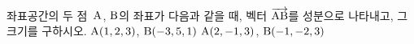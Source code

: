 좌표공간의 두 점~$\mathrm{A}$, $\mathrm{B}$의 좌표가 다음과 같을 때, 벡터 $\overrightarrow{\mathrm{AB}}$를 성분으로 나타내고, 그 크기를 구하시오.
 $\mathrm{A}(1{,}\mkern3mu\mathopen{}2{,}\mkern3mu\mathopen{}3)$, $\mathrm{B}(-3{,}\mkern3mu\mathopen{}5{,}\mkern3mu\mathopen{}1)$
 $\mathrm{A}(2{,}\mkern3mu\mathopen{}-1{,}\mkern3mu\mathopen{}3)$, $\mathrm{B}(-1{,}\mkern3mu\mathopen{}-2{,}\mkern3mu\mathopen{}3)$
